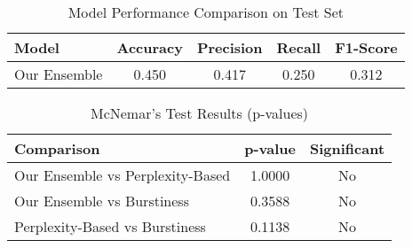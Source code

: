 
\begin{table}[h]
\centering
\caption{Model Performance Comparison on Test Set}
\begin{tabular}{lcccc}
\hline
\textbf{Model} & \textbf{Accuracy} & \textbf{Precision} & \textbf{Recall} & \textbf{F1-Score} \\
\hline
Our Ensemble & 0.450 & 0.417 & 0.250 & 0.312 \\
\hline
\end{tabular}
\label{tab:performance}
\end{table}

\begin{table}[h]
\centering
\caption{McNemar's Test Results (p-values)}
\begin{tabular}{lcc}
\hline
\textbf{Comparison} & \textbf{p-value} & \textbf{Significant} \\
\hline
Our Ensemble vs Perplexity-Based & 1.0000 & No \\
Our Ensemble vs Burstiness & 0.3588 & No \\
Perplexity-Based vs Burstiness & 0.1138 & No \\
\hline
\end{tabular}
\label{tab:significance}
\end{table}
